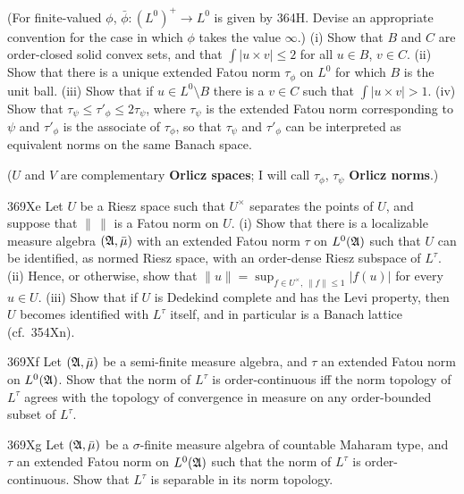 {
     
\noindent (For finite-valued $\phi$, $\bar\phi:(L^0)^+\to L^0$ is given
by 364H.   Devise an appropriate convention for the case in which
$\phi$ takes the value $\infty$.)   (i) Show that $B$ and $C$ are
order-closed solid convex sets, and that $\int|u\times v|\le 2$ for all
$u\in B$, $v\in C$.   
(ii) Show that there is a unique extended Fatou norm $\tau_{\phi}$ on
$L^0$ for which $B$ is the unit ball.  (iii) Show that if
$u\in L^0\setminus B$ there is a $v\in C$ such that $\int|u\times v|>1$.
   (iv) Show that
$\tau_{\psi}\le\tau'_{\phi}\le 2\tau_{\psi}$, where $\tau_{\psi}$ is the
extended Fatou norm corresponding to $\psi$ and $\tau'_{\phi}$ is the
associate of $\tau_{\phi}$, so that $\tau_{\psi}$ and $\tau'_{\phi}$ can
be interpreted as equivalent norms on the same Banach space.
     
($U$ and $V$ are complementary {\bf Orlicz spaces};  I will call
$\tau_{\phi}$, $\tau_{\psi}$ {\bf Orlicz norms}.)
     
\spheader 369Xe Let $U$ be a Riesz space such that $U^{\times}$
separates the points of $U$, and suppose that $\|\,\|$ is a Fatou norm
on $U$.  (i) Show that there is a localizable measure algebra
$(\frak A,\bar\mu)$ with an extended Fatou norm $\tau$ on $L^0(\frak A)$
such that $U$ can be identified, as normed Riesz space, with an
order-dense Riesz subspace of $L^{\tau}$.    (ii) Hence, or otherwise,
show that $\|u\|=\sup_{f\in U^{\times},\,\|f\|\le 1}|f(u)|$ for every
$u\in U$.
(iii) Show that if $U$ is Dedekind complete and has the Levi property,
then $U$ becomes identified with $L^{\tau}$ itself, and in particular is
a Banach lattice (cf.\ 354Xn).
     
\spheader 369Xf Let $(\frak A,\bar\mu)$ be a semi-finite measure
algebra, and $\tau$ an extended Fatou norm on $L^0(\frak A)$.   Show
that the norm of $L^{\tau}$ is order-continuous iff the norm topology of
$L^{\tau}$ agrees with the topology of convergence in measure on any
order-bounded subset of $L^{\tau}$.
     
\spheader 369Xg Let $(\frak A,\bar\mu)$ be a $\sigma$-finite measure
algebra of countable Maharam type, and $\tau$ an extended Fatou norm on
$L^0(\frak A)$ such that the norm of $L^{\tau}$ is order-continuous.
Show that $L^{\tau}$ is separable in its norm topology.
     
}
